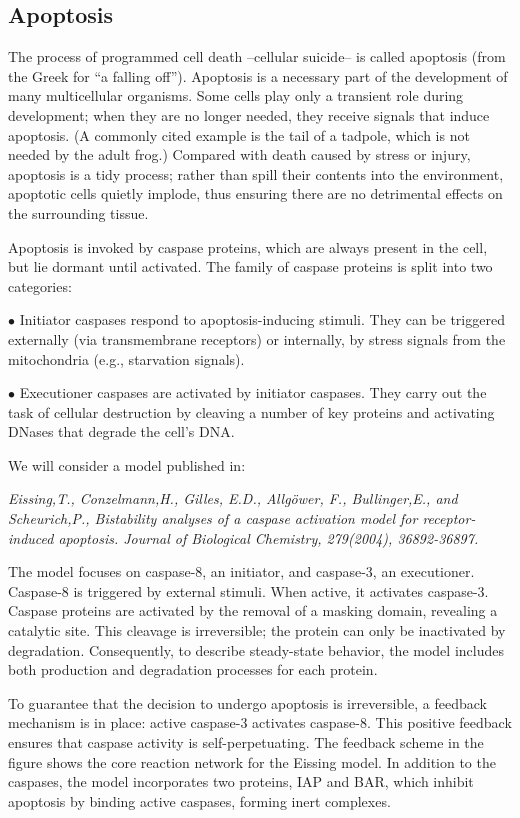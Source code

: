 \documentclass[12pt]{article}
\newcommand{\bi}{\begin{itemize}}
\begin{document}
\subsection*{Apoptosis}

The process of programmed cell death --cellular suicide-- is called apoptosis
(from the Greek for ``a falling off''). Apoptosis is a necessary part of the
development of many multicellular organisms.
Some cells play only a transient role during development; when they are no
longer needed, they receive signals that induce apoptosis. (A commonly cited
example is the tail of a tadpole, which is not needed by the adult frog.)
Compared with death caused by stress or injury, apoptosis is a tidy process;
rather than spill their contents into the environment, apoptotic cells quietly
implode, thus ensuring there are no detrimental effects on the surrounding
tissue. 

Apoptosis is invoked by caspase proteins, which are always present in the
cell, but lie dormant until activated. The family of caspase proteins is split
into two categories:

$\bullet$
Initiator caspases respond to apoptosis-inducing stimuli. They can be
triggered externally (via transmembrane receptors) or internally, by stress
signals from the mitochondria (e.g., starvation signals).

$\bullet$
Executioner caspases are activated by initiator caspases. They carry out the
task of cellular destruction by cleaving a number of key proteins and
activating DNases that degrade the cell's DNA.

We will consider a model published in:

\emph{Eissing,T., Conzelmann,H., Gilles, E.D., Allg\"ower, F., Bullinger,E., and
Scheurich,P., Bistability analyses of a caspase activation model for
receptor-induced apoptosis. Journal of Biological Chemistry, 279(2004),
36892-36897.}

The model focuses on caspase-8, an initiator, and caspase-3, an
executioner. Caspase-8 is triggered by external stimuli. When active, it
activates caspase-3. Caspase proteins are activated by the removal of a
masking domain, revealing a catalytic site. This cleavage is irreversible; the
protein can only be inactivated by degradation. Consequently, to describe
steady-state behavior, the model includes both production and degradation
processes for each protein.

To guarantee that the decision to undergo apoptosis is irreversible, a
feedback mechanism is in place: active caspase-3 activates caspase-8. This
positive feedback ensures that caspase activity is self-perpetuating. The
feedback scheme in the figure shows the core reaction
network for the Eissing model. In addition to the caspases, the model
incorporates two proteins, IAP and BAR, which inhibit apoptosis by binding
active caspases, forming inert complexes.
\end{document}
